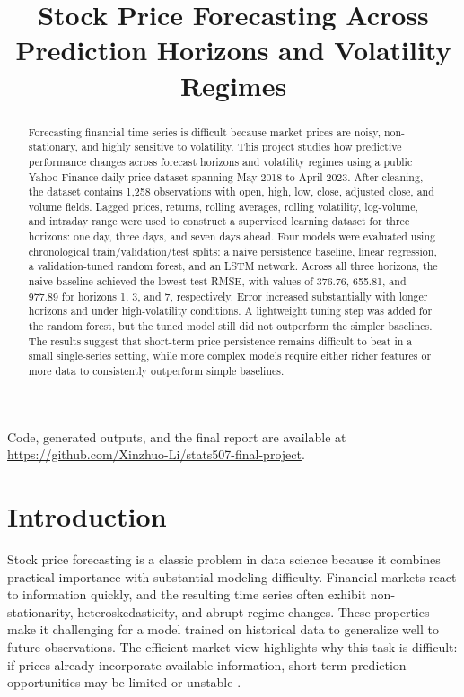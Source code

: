 \documentclass[conference]{IEEEtran}
\title{Stock Price Forecasting Across Prediction Horizons and Volatility Regimes}
\author{\IEEEauthorblockN{Xinzhuo Li}
\IEEEauthorblockA{STATS 507 Final Project}}
\begin{document}
\maketitle

\begin{abstract}
Forecasting financial time series is difficult because market prices are noisy, non-stationary, and highly sensitive to volatility. This project studies how predictive performance changes across forecast horizons and volatility regimes using a public Yahoo Finance daily price dataset spanning May 2018 to April 2023. After cleaning, the dataset contains 1,258 observations with open, high, low, close, adjusted close, and volume fields. Lagged prices, returns, rolling averages, rolling volatility, log-volume, and intraday range were used to construct a supervised learning dataset for three horizons: one day, three days, and seven days ahead. Four models were evaluated using chronological train/validation/test splits: a naive persistence baseline, linear regression, a validation-tuned random forest, and an LSTM network. Across all three horizons, the naive baseline achieved the lowest test RMSE, with values of 376.76, 655.81, and 977.89 for horizons 1, 3, and 7, respectively. Error increased substantially with longer horizons and under high-volatility conditions. A lightweight tuning step was added for the random forest, but the tuned model still did not outperform the simpler baselines. The results suggest that short-term price persistence remains difficult to beat in a small single-series setting, while more complex models require either richer features or more data to consistently outperform simple baselines.
\end{abstract}

Code, generated outputs, and the final report are available at \url{https://github.com/Xinzhuo-Li/stats507-final-project}.

\section{Introduction}
Stock price forecasting is a classic problem in data science because it combines practical importance with substantial modeling difficulty. Financial markets react to information quickly, and the resulting time series often exhibit non-stationarity, heteroskedasticity, and abrupt regime changes. These properties make it challenging for a model trained on historical data to generalize well to future observations. The efficient market view highlights why this task is difficult: if prices already incorporate available information, short-term prediction opportunities may be limited or unstable \cite{fama1970efficient}.
\end{document}
